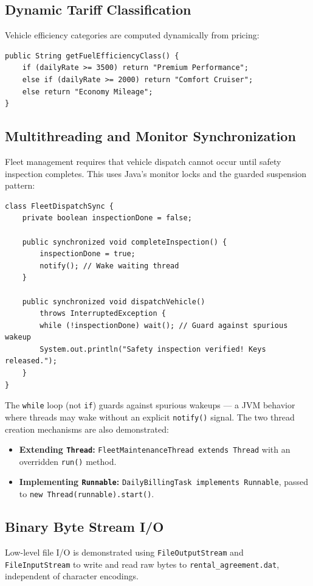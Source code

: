 \documentclass[11pt,a4paper]{article}
\begin{document}
\subsection{Dynamic Tariff Classification}
Vehicle efficiency categories are computed dynamically from pricing:
\begin{lstlisting}[caption={Fuel Efficiency Decision Logic}]
public String getFuelEfficiencyClass() {
    if (dailyRate >= 3500) return "Premium Performance";
    else if (dailyRate >= 2000) return "Comfort Cruiser";
    else return "Economy Mileage";
}
\end{lstlisting}

\subsection{Multithreading and Monitor Synchronization}
Fleet management requires that vehicle dispatch cannot occur until safety inspection completes. This uses Java's monitor locks and the guarded suspension pattern:

\begin{lstlisting}[caption={Thread Synchronization with Guarded Suspension}]
class FleetDispatchSync {
    private boolean inspectionDone = false;

    public synchronized void completeInspection() {
        inspectionDone = true;
        notify(); // Wake waiting thread
    }

    public synchronized void dispatchVehicle()
        throws InterruptedException {
        while (!inspectionDone) wait(); // Guard against spurious wakeup
        System.out.println("Safety inspection verified! Keys released.");
    }
}
\end{lstlisting}

The \texttt{while} loop (not \texttt{if}) guards against spurious wakeups --- a JVM behavior where threads may wake without an explicit \texttt{notify()} signal. The two thread creation mechanisms are also demonstrated:
\begin{itemize}
    \item \textbf{Extending \texttt{Thread}:} \texttt{FleetMaintenanceThread extends Thread} with an overridden \texttt{run()} method.
    \item \textbf{Implementing \texttt{Runnable}:} \texttt{DailyBillingTask implements Runnable}, passed to \texttt{new Thread(runnable).start()}.
\end{itemize}

\subsection{Binary Byte Stream I/O}
Low-level file I/O is demonstrated using \texttt{FileOutputStream} and \texttt{FileInputStream} to write and read raw bytes to \texttt{rental\_agreement.dat}, independent of character encodings.
\end{document}
